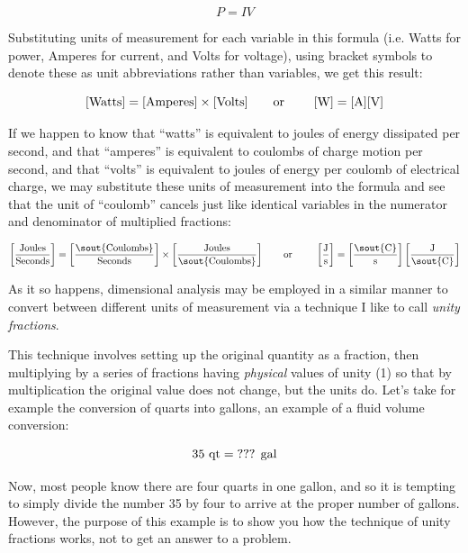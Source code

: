 $$P = IV$$

Substituting units of measurement for each variable in this formula (i.e. Watts for power, Amperes for current, and Volts for voltage), using bracket symbols to denote these as unit abbreviations rather than variables, we get this result:

$$[\hbox{Watts}] = [\hbox{Amperes}] \times [\hbox{Volts}] \hbox{\hskip 20pt or \hskip 20pt} [\hbox{W}] = [\hbox{A}] [\hbox{V}]$$

If we happen to know that ``watts'' is equivalent to joules of energy dissipated per second, and that ``amperes'' is equivalent to coulombs of charge motion per second, and that ``volts'' is equivalent to joules of energy per coulomb of electrical charge, we may substitute these units of measurement into the formula and see that the unit of ``coulomb'' cancels just like identical variables in the numerator and denominator of multiplied fractions:

$$\left[\hbox{Joules} \over \hbox{Seconds} \right] = \left[\hbox{\sout{Coulombs}} \over \hbox{Seconds}\right] \times \left[\hbox{Joules} \over \hbox{\sout{Coulombs}}\right] \hbox{\hskip 20pt or \hskip 20pt} \left[\hbox{J} \over \hbox{s} \right] = \left[\hbox{\sout{C}} \over \hbox{s} \right] \left[\hbox{J} \over \hbox{\sout{C}} \right]$$

\vskip 10pt

As it so happens, dimensional analysis may be employed in a similar manner to convert between different units of measurement via a technique I like to call \textit{unity fractions}.  

This technique involves setting up the original quantity as a fraction, then multiplying by a series of fractions having \textit{physical} values of unity (1) so that by multiplication the original value does not change, but the units do.  Let's take for example the conversion of quarts into gallons, an example of a fluid volume conversion:

$$35 \hbox{ qt} = \hbox{??? gal}$$

Now, most people know there are four quarts in one gallon, and so it is tempting to simply divide the number 35 by four to arrive at the proper number of gallons.  However, the purpose of this example is to show you how the technique of unity fractions works, not to get an answer to a problem.  

\vskip 10pt

\filbreak

